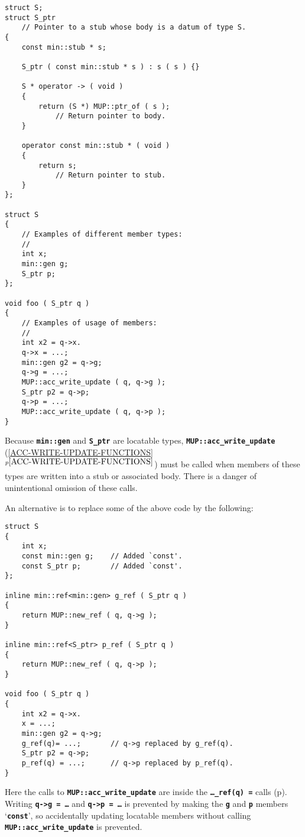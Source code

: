 \documentclass[12pt]{article}
\newcommand{\TT}[1]{{\tt \bfseries #1}}
\newcommand{\itemref}[1]{\ref{#1}$^{p\pageref{#1}}$}
\newcommand{\pagref}[1]{p\pageref{#1}}
\newcommand{\EOL}{\penalty \exhyphenpenalty}
\newenvironment{indpar}[1][0.3in]%
	{\begin{list}{}%
		     {\setlength{\itemsep}{0in}%
		      \setlength{\topsep}{0in}%
		      \setlength{\parsep}{1ex}%
		      \setlength{\labelwidth}{#1}%
		      \setlength{\leftmargin}{#1}%
		      \addtolength{\leftmargin}{\labelsep}}%
	 \item}%
	{\end{list}}
\begin{document}
\begin{indpar}\begin{verbatim}
struct S;
struct S_ptr
    // Pointer to a stub whose body is a datum of type S.
{
    const min::stub * s;

    S_ptr ( const min::stub * s ) : s ( s ) {}

    S * operator -> ( void )
    {
        return (S *) MUP::ptr_of ( s );
            // Return pointer to body.
    }

    operator const min::stub * ( void )
    {
        return s;
            // Return pointer to stub.
    }
};

struct S
{
    // Examples of different member types:
    //
    int x;
    min::gen g;
    S_ptr p;
};

void foo ( S_ptr q )
{
    // Examples of usage of members:
    //
    int x2 = q->x.
    q->x = ...;
    min::gen g2 = q->g;
    q->g = ...;
    MUP::acc_write_update ( q, q->g );
    S_ptr p2 = q->p;
    q->p = ...;
    MUP::acc_write_update ( q, q->p );
}
\end{verbatim}\end{indpar}

Because \TT{min::gen} and \TT{S\_ptr} are locatable types,
\TT{MUP::\EOL acc\_\EOL write\_\EOL update}
(\itemref{ACC-WRITE-UPDATE-FUNCTIONS}) must be called when
members of these types are written into a stub or associated body.  There is
a danger of unintentional omission of these calls.

An alternative is to replace some of the above code by the following:

\begin{indpar}\begin{verbatim}
struct S
{
    int x;
    const min::gen g;    // Added `const'.
    const S_ptr p;       // Added `const'.
};

inline min::ref<min::gen> g_ref ( S_ptr q )
{
    return MUP::new_ref ( q, q->g );
}

inline min::ref<S_ptr> p_ref ( S_ptr q )
{
    return MUP::new_ref ( q, q->p );
}

void foo ( S_ptr q )
{
    int x2 = q->x.
    x = ...;
    min::gen g2 = q->g;
    g_ref(q)= ...;       // q->g replaced by g_ref(q).
    S_ptr p2 = q->p;
    p_ref(q) = ...;      // q->p replaced by p_ref(q).
}
\end{verbatim}\end{indpar}

Here the calls to \TT{MUP::acc\_write\_update} are inside the
\TT{\ldots\_ref(q) =} calls (\pagref{LOCATABLE_REF}).
Writing \TT{q->g = \ldots}
and \TT{q->p = \ldots} is prevented by making the \TT{g} and \TT{p}
members `\TT{const}', so accidentally updating locatable members
without calling \TT{MUP::\EOL acc\_\EOL write\_\EOL update}
is prevented.
\end{document}
